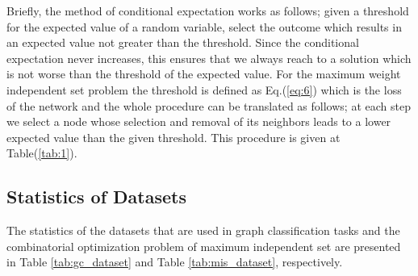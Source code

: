 \documentclass{article}
\begin{document}
Briefly, the method of conditional expectation works as follows; given a threshold for the expected value of a random variable, select the outcome which results in an expected value not greater than the threshold. Since the conditional expectation never increases, this ensures that we always reach to a solution which is not worse than the threshold of the expected value. For the maximum weight independent set problem the threshold is defined as Eq.(\ref{eq:6}) which is the loss of the network and the whole procedure can be translated as follows; at each step we select a node whose selection and removal of its neighbors leads to a lower expected value than the given threshold. This procedure is given at Table(\ref{tab:1}). 


\subsection{Statistics of Datasets}
The statistics of the datasets that are used in graph classification tasks and the combinatorial optimization problem of maximum independent set are presented in Table \ref{tab:gc_dataset} and Table \ref{tab:mis_dataset}, respectively.
\begin{table*}[ht]
	\centering
	\caption{Datasets statistics for the supervised graph classification task.}
	\label{tab:gc_dataset}
\end{table*}
\begin{table}[ht]
	\centering
	\caption{Datasets statistics for the unsupervised combinatorial optimization problem of maximum independent set.}
	\label{tab:mis_dataset}
\end{table}
\end{document}
